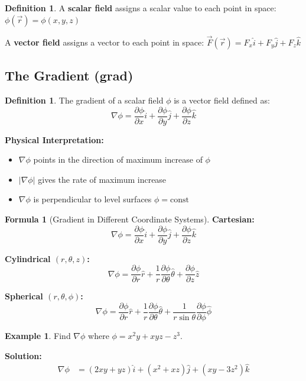 \documentclass[12pt,a4paper]{article}
\theoremstyle{definition}
\newtheorem{definition}[theorem]{Definition}
\newtheorem{example}[theorem]{Example}
\newtheorem{formula}[theorem]{Formula}
\begin{document}
\begin{definition}
A \textbf{scalar field} assigns a scalar value to each point in space: $\phi(\vec{r}) = \phi(x,y,z)$

A \textbf{vector field} assigns a vector to each point in space: $\vec{F}(\vec{r}) = F_x\hat{i} + F_y\hat{j} + F_z\hat{k}$
\end{definition}

\subsection{The Gradient (grad)}

\begin{definition}
The gradient of a scalar field $\phi$ is a vector field defined as:
\[
\nabla\phi = \frac{\partial\phi}{\partial x}\hat{i} + \frac{\partial\phi}{\partial y}\hat{j} + \frac{\partial\phi}{\partial z}\hat{k}
\]
\end{definition}

\begin{importantbox}
\textbf{Physical Interpretation:}
\begin{itemize}
    \item $\nabla\phi$ points in the direction of maximum increase of $\phi$
    \item $|\nabla\phi|$ gives the rate of maximum increase
    \item $\nabla\phi$ is perpendicular to level surfaces $\phi = \text{const}$
\end{itemize}
\end{importantbox}

\begin{formula}[Gradient in Different Coordinate Systems]
\textbf{Cartesian:} 
\[
\nabla\phi = \frac{\partial\phi}{\partial x}\hat{i} + \frac{\partial\phi}{\partial y}\hat{j} + \frac{\partial\phi}{\partial z}\hat{k}
\]

\textbf{Cylindrical $(r,\theta,z)$:}
\[
\nabla\phi = \frac{\partial\phi}{\partial r}\hat{r} + \frac{1}{r}\frac{\partial\phi}{\partial\theta}\hat{\theta} + \frac{\partial\phi}{\partial z}\hat{z}
\]

\textbf{Spherical $(r,\theta,\phi)$:}
\[
\nabla\phi = \frac{\partial\phi}{\partial r}\hat{r} + \frac{1}{r}\frac{\partial\phi}{\partial\theta}\hat{\theta} + \frac{1}{r\sin\theta}\frac{\partial\phi}{\partial\phi}\hat{\phi}
\]
\end{formula}

\begin{example}
Find $\nabla\phi$ where $\phi = x^2y + xyz - z^3$.

\textbf{Solution:}
\begin{align*}
\nabla\phi &= \left(2xy + yz\right)\hat{i} + \left(x^2 + xz\right)\hat{j} + \left(xy - 3z^2\right)\hat{k}
\end{align*}
\end{example}
\end{document}
